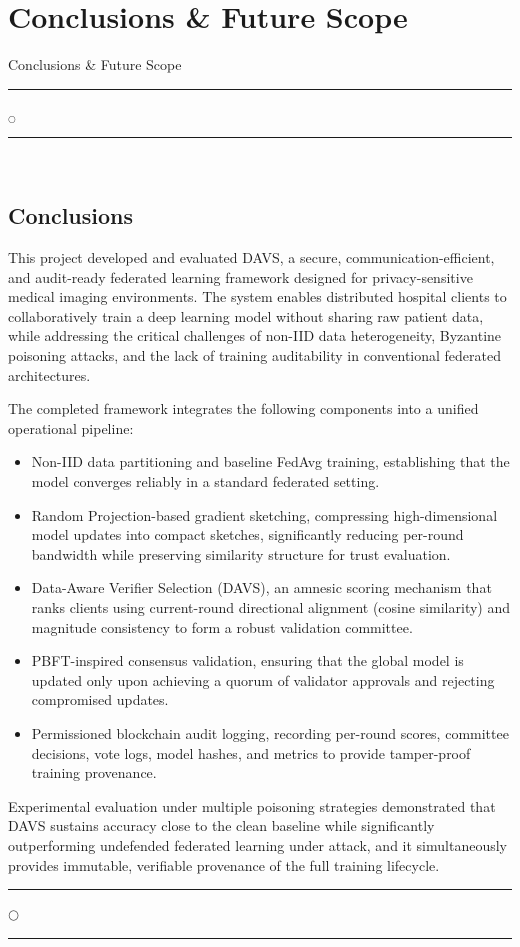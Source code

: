 \chapter[Conclusions \& Future Scope]{Conclusions \& Future Scope}{Conclusions \& Future Scope}\label{res}

\noindent
\rule{0.49\textwidth}{0.75pt} $_{\bigcirc}$ \rule{0.49\textwidth}{0.75pt}\\
\section{Conclusions}
This project developed and evaluated DAVS, a secure, communication-efficient, and audit-ready federated learning framework designed for privacy-sensitive medical imaging environments. The system enables distributed hospital clients to collaboratively train a deep learning model without sharing raw patient data, while addressing the critical challenges of non-IID data heterogeneity, Byzantine poisoning attacks, and the lack of training auditability in conventional federated architectures.

The completed framework integrates the following components into a unified operational pipeline:
\begin{itemize}
    \item Non-IID data partitioning and baseline FedAvg training, establishing that the model converges reliably in a standard federated setting.
    \item Random Projection-based gradient sketching, compressing high-dimensional model updates into compact sketches, significantly reducing per-round bandwidth while preserving similarity structure for trust evaluation.
    \item Data-Aware Verifier Selection (DAVS), an amnesic scoring mechanism that ranks clients using current-round directional alignment (cosine similarity) and magnitude consistency to form a robust validation committee.
    \item PBFT-inspired consensus validation, ensuring that the global model is updated only upon achieving a quorum of validator approvals and rejecting compromised updates.
    \item Permissioned blockchain audit logging, recording per-round scores, committee decisions, vote logs, model hashes, and metrics to provide tamper-proof training provenance.
\end{itemize}

Experimental evaluation under multiple poisoning strategies demonstrated that DAVS sustains accuracy close to the clean baseline while significantly outperforming undefended federated learning under attack, and it simultaneously provides immutable, verifiable provenance of the full training lifecycle.
\noindent
\begin{center}
\rule{0.45\textwidth}{0.75pt} \; $\bigcirc$ \; \rule{0.45\textwidth}{0.75pt}
\end{center}

